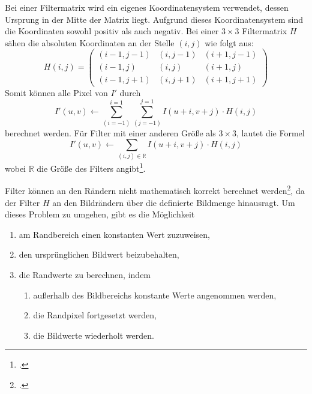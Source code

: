 Bei einer Filtermatrix wird ein eigenes Koordinatensystem verwendet, dessen Ursprung in der Mitte der Matrix liegt.
 Aufgrund dieses Koordinatensystem sind die Koordinaten sowohl positiv als auch negativ. Bei einer $3 \times 3$
 Filtermatrix $H$ sähen die absoluten Koordinaten an der Stelle $(i,j)$ wie folgt aus:
\begin{equation}
	H(i,j) =
	\begin{pmatrix}
		\left(i-1, j-1\right)&	\left(i, j-1\right)&	\left(i+1, j-1\right)\\
		\left(i-1, j\right)& 	\left(i, j\right)&		\left(i+1, j\right)\\
		\left(i-1, j+1\right)&	\left(i, j+1\right)&	\left(i+1, j+1\right)
	\end{pmatrix}
\end{equation}
Somit können alle Pixel von $I'$ durch
\begin{equation}
	I'\left(u,v\right) \gets
	\sum \limits_{\left(i = -1\right)}^{i = 1}
	\sum \limits_{\left(j = -1\right)}^{j = 1}
	I\left(u + i, v + j\right) \cdot H\left(i,j\right)
\end{equation}
berechnet werden. Für Filter mit einer anderen Größe als $3 \times 3$, lautet die Formel
\begin{equation}
	I'\left(u,v\right) \gets
	\sum_{\left(i,j\right)\in\mathbb{R}} I\left(u + i, v + j\right) \cdot H\left(i,j\right)
\end{equation}
wobei $\mathbb{R}$ die Größe des Filters angibt\footcite[Vgl.][S.~92--93]{burger05}.

Filter können an den Rändern nicht mathematisch korrekt berechnet werden\footcite[Vgl.][S.~113]{burger05}, da der
 Filter $H$ an den Bildrändern über die definierte Bildmenge hinausragt. Um dieses Problem zu umgehen, gibt es die
 Möglichkeit
\begin{enumerate}
	\item am Randbereich einen konstanten Wert zuzuweisen,\label{konstant}
	\item den ursprünglichen Bildwert beizubehalten,\label{nix}
	\item die Randwerte zu berechnen, indem
	\begin{enumerate}
		\item außerhalb des Bildbereichs konstante Werte angenommen werden,\label{berechneKonstant}
		\item die Randpixel fortgesetzt werden,\label{berechneRand}
		\item die Bildwerte wiederholt werden.\label{berechneBild}
	\end{enumerate}
\end{enumerate}


